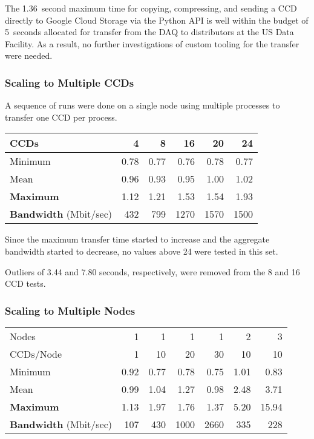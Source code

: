The 1.36~second maximum time for copying, compressing, and sending a CCD directly to Google Cloud Storage via the Python API is well within the budget of 5~seconds allocated for transfer from the DAQ to distributors at the US Data Facility.
As a result, no further investigations of custom tooling for the transfer were needed.

\subsubsection{Scaling to Multiple CCDs}

A sequence of runs were done on a single node using multiple processes to transfer one CCD per process.

\begin{tabular}{l *{5}r}
CCDs             & 4    & 8    & 16   & 20   & 24 \\
\hline
Minimum          & 0.78 & 0.77 & 0.76 & 0.78 & 0.77 \\
Mean             & 0.96 & 0.93 & 0.95 & 1.00 & 1.02 \\
\textbf{Maximum} & 1.12 & 1.21 & 1.53 & 1.54 & 1.93 \\
\textbf{Bandwidth} (Mbit/sec) & 432 & 799 & 1270 & 1570 & 1500 \\
\end{tabular}

Since the maximum transfer time started to increase and the aggregate bandwidth started to decrease, no values above 24 were tested in this set.

Outliers of 3.44 and 7.80 seconds, respectively, were removed from the 8 and 16 CCD tests.

\subsubsection{Scaling to Multiple Nodes}

\begin{tabular}{l *{6}r}
Nodes            & 1    & 1    & 1    & 1    & 2    & 3 \\
CCDs/Node        & 1    & 10   & 20   & 30   & 10   & 10 \\
\hline
Minimum          & 0.92 & 0.77 & 0.78 & 0.75 & 1.01 & 0.83 \\
Mean             & 0.99 & 1.04 & 1.27 & 0.98 & 2.48 & 3.71 \\
\textbf{Maximum} & 1.13 & 1.97 & 1.76 & 1.37 & 5.20 & 15.94 \\
\textbf{Bandwidth} (Mbit/sec) & 107 & 430 & 1000 & 2660 & 335 & 228 \\
\end{tabular}

